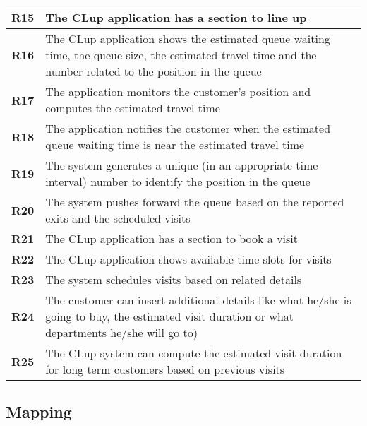 \begin{center}
{\begin{longtable}{L{2cm}L{12cm}}
        \hline
        \textbf{R15} & The CLup application has a section to line up \\
        \hline
        \textbf{R16} & The CLup application shows the estimated queue waiting time, the queue size, the estimated travel time and the number related to the position in the queue \\
        \hline
        \textbf{R17} & The application monitors the customer's position and computes the estimated travel time \\
        \hline
        \textbf{R18} & The application notifies the customer when the estimated queue waiting time is near the estimated travel time \\
        \hline
        \textbf{R19} & The system generates a unique (in an appropriate time interval) number to identify the position in the queue \\
        \hline
        \textbf{R20} & The system pushes forward the queue based on the reported exits and the scheduled visits \\
        \hline
        \textbf{R21} & The CLup application has a section to book a visit \\
        \hline
        \textbf{R22} & The CLup application shows available time slots for visits \\
        \hline
        \textbf{R23} & The system schedules visits based on related details \\
        \hline
        \textbf{R24} & The customer can insert additional details like what he/she is going to buy, the estimated visit duration or what departments he/she will go to) \\
        \hline
        \textbf{R25} & The CLup system can compute the estimated visit duration for long term customers based on previous visits \\
        \hline
    \end{longtable}}
\end{center}

\subsection{Mapping}